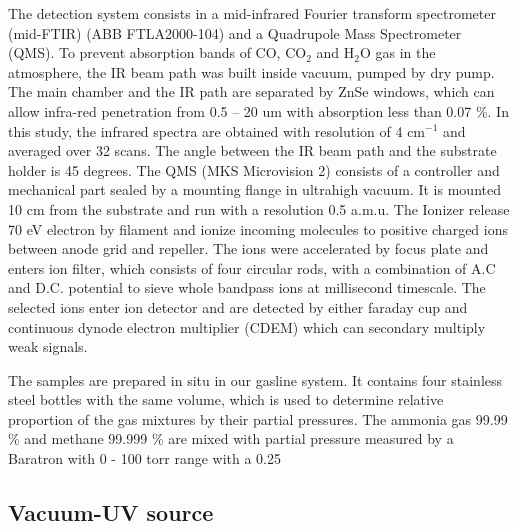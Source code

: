 The detection system consists in a mid-infrared Fourier transform spectrometer (mid-FTIR) (ABB FTLA2000-104) and a Quadrupole Mass Spectrometer (QMS). To prevent absorption bands of CO, CO$_2$ and H$_2$O gas in the atmosphere, the IR beam path was built inside vacuum, pumped by dry pump. The main chamber and the IR path are separated by ZnSe windows, which can allow infra-red penetration from 0.5 – 20 um with absorption less than 0.07 \%. In this study, the infrared spectra are obtained with resolution of 4 cm$^{-1}$ and averaged over 32 scans. The angle between the IR beam path and the substrate holder is 45 degrees. The QMS (MKS Microvision 2) consists of a controller and mechanical part sealed by a mounting flange in ultrahigh vacuum. It is mounted 10 cm from the substrate and run with a resolution 0.5 a.m.u. The Ionizer release 70 eV electron by filament and ionize incoming molecules to positive charged ions between anode grid and repeller. The ions were accelerated by focus plate and enters ion filter, which consists of four circular rods, with a combination of A.C and D.C. potential to sieve whole bandpass ions at millisecond timescale. The selected ions enter ion detector and are detected by either faraday cup and continuous dynode electron multiplier (CDEM) which can secondary multiply weak signals.

The samples are prepared in situ in our gasline system. It contains four stainless steel bottles with the same volume, which is used to determine relative proportion of the gas mixtures by their partial pressures. The ammonia gas 99.99 \% and methane 99.999 \% are mixed with partial pressure measured by a Baratron with 0 - 100 torr range with a 0.25%

\subsection{Vacuum-UV source}
\label{sec:Vacuum_UV_source}


